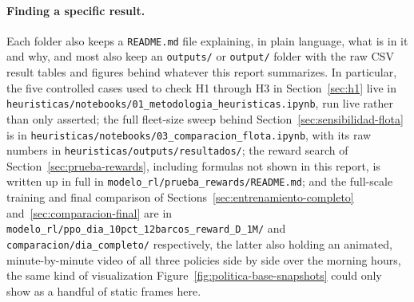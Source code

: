 \documentclass[11pt,a4paper]{article}
\begin{document}
\paragraph{Finding a specific result.} Each folder also keeps a \texttt{README.md} file explaining, in plain language, what is in it and why, and most also keep an \texttt{outputs/} or \texttt{output/} folder with the raw CSV result tables and figures behind whatever this report summarizes. In particular, the five controlled cases used to check H1 through H3 in Section~\ref{sec:h1} live in \texttt{heuristicas/notebooks/01\_metodologia\_heuristicas.ipynb}, run live rather than only asserted; the full fleet-size sweep behind Section~\ref{sec:sensibilidad-flota} is in \texttt{heuristicas/notebooks/03\_comparacion\_flota.ipynb}, with its raw numbers in \texttt{heuristicas/outputs/resultados/}; the reward search of Section~\ref{sec:prueba-rewards}, including formulas not shown in this report, is written up in full in \texttt{modelo\_rl/prueba\_rewards/README.md}; and the full-scale training and final comparison of Sections~\ref{sec:entrenamiento-completo} and~\ref{sec:comparacion-final} are in \texttt{modelo\_rl/ppo\_dia\_10pct\_12barcos\_reward\_D\_1M/} and \texttt{comparacion/dia\_completo/} respectively, the latter also holding an animated, minute-by-minute video of all three policies side by side over the morning hours, the same kind of visualization Figure~\ref{fig:politica-base-snapshots} could only show as a handful of static frames here.



\end{document}
